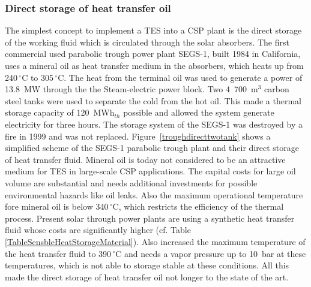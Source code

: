 \subsubsection{Direct storage of heat transfer oil}
The simplest concept to implement a TES into a CSP plant is the direct storage of the working fluid which is circulated through the solar absorbers. The first commercial used parabolic trough power plant SEGS-1, built 1984 in California, uses a mineral oil as heat transfer medium in the absorbers, which heats up from 240$\,^{\circ}\mathrm{C}$ to 305$\,^{\circ}\mathrm{C}$. The heat from the terminal oil was used to generate a power of 13.8~MW through the the Steam-electric power block. Two 4~700~m$^3$ carbon steel  tanks were used to separate the cold from the hot oil. This made a thermal storage capacity of 120~MWh$_{th}$ possible and allowed the system generate electricity for three hours. The storage system of the SEGS-1 was destroyed by a fire in 1999 and was not replaced. Figure~\ref{troughdirecttwotank} shows a simplified scheme of the SEGS-1 parabolic trough plant and their direct storage of heat transfer fluid. Mineral oil is today not considered to be an attractive medium for TES in large-scale CSP applications. The capital costs for large oil volume are substantial and needs additional investments for possible environmental hazards like oil leaks. Also the maximum operational temperature fore mineral oil is below 340$\,^{\circ}\mathrm{C}$, which restricts the efficiency of the thermal process. Present solar through power plants are using a synthetic heat transfer fluid whose costs are significantly higher (cf. Table \ref{TableSensbleHeatStorageMaterial}). Also increased the maximum temperature of the heat transfer fluid to 390$\,^{\circ}\mathrm{C}$ and needs a vapor pressure up to 10~bar at these temperatures, which is not able to storage stable at these conditions. All this made the direct storage of heat transfer oil not longer to the state of the art. \cite{Richter2013}

